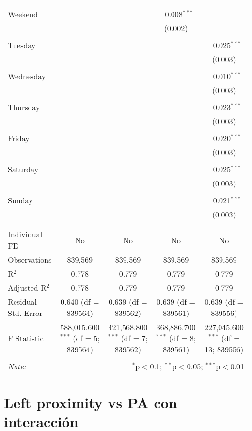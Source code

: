 \documentclass[
]{article}
\begin{document}
\begin{table}[!htbp]
{\begin{tabular}{@{\extracolsep{5pt}}lcccc}
  & & & & \\ 
 Weekend &  &  & $-$0.008$^{***}$ &  \\ 
  &  &  & (0.002) &  \\ 
  & & & & \\ 
 Tuesday &  &  &  & $-$0.025$^{***}$ \\ 
  &  &  &  & (0.003) \\ 
  & & & & \\ 
 Wednesday &  &  &  & $-$0.010$^{***}$ \\ 
  &  &  &  & (0.003) \\ 
  & & & & \\ 
 Thursday &  &  &  & $-$0.023$^{***}$ \\ 
  &  &  &  & (0.003) \\ 
  & & & & \\ 
 Friday &  &  &  & $-$0.020$^{***}$ \\ 
  &  &  &  & (0.003) \\ 
  & & & & \\ 
 Saturday &  &  &  & $-$0.025$^{***}$ \\ 
  &  &  &  & (0.003) \\ 
  & & & & \\ 
 Sunday &  &  &  & $-$0.021$^{***}$ \\ 
  &  &  &  & (0.003) \\ 
  & & & & \\ 
\hline \\[-1.8ex] 
Individual FE & No & No & No & No \\ 
Observations & 839,569 & 839,569 & 839,569 & 839,569 \\ 
R$^{2}$ & 0.778 & 0.779 & 0.779 & 0.779 \\ 
Adjusted R$^{2}$ & 0.778 & 0.779 & 0.779 & 0.779 \\ 
Residual Std. Error & 0.640 (df = 839564) & 0.639 (df = 839562) & 0.639 (df = 839561) & 0.639 (df = 839556) \\ 
F Statistic & 588,015.600$^{***}$ (df = 5; 839564) & 421,568.800$^{***}$ (df = 7; 839562) & 368,886.700$^{***}$ (df = 8; 839561) & 227,045.600$^{***}$ (df = 13; 839556) \\ 
\hline 
\hline \\[-1.8ex] 
\textit{Note:}  & \multicolumn{4}{r}{$^{*}$p$<$0.1; $^{**}$p$<$0.05; $^{***}$p$<$0.01} \\ 
\end{tabular}
} 
\end{table} 
\newpage
\section{Left proximity vs PA con interacción}
\end{document}
